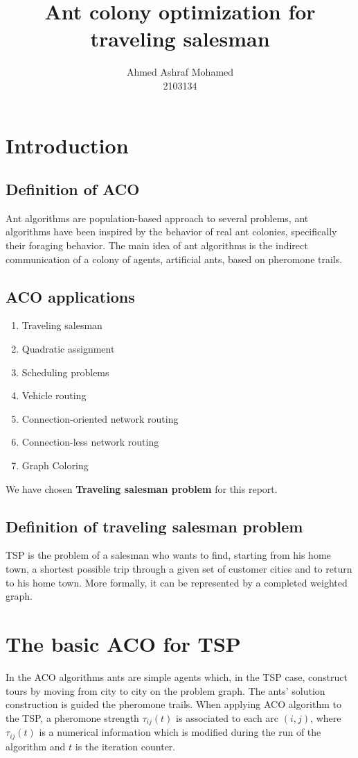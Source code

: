 \documentclass[12pt]{article}
\title{Ant colony optimization for traveling salesman}
\author{Ahmed Ashraf Mohamed \\ 2103134}
\date{}
\begin{document}
\maketitle
\section{Introduction}
\subsection{Definition of ACO}
Ant algorithms are population-based approach to several problems, ant algorithms have been inspired by the behavior of real ant colonies, specifically their foraging behavior. The main idea of ant algorithms is the indirect communication of a colony of agents, artificial ants, based on pheromone trails.
\subsection{ACO applications}
\begin{enumerate}
    \item Traveling salesman
    \item Quadratic assignment
    \item Scheduling problems
    \item Vehicle routing
    \item Connection-oriented network routing
    \item Connection-less network routing
    \item Graph Coloring
\end{enumerate}
We have chosen \textbf{Traveling salesman problem} for this report.
\subsection{Definition of traveling salesman problem}
TSP is the problem of a salesman who wants to find, starting from his home town, a shortest possible trip through a given set of customer cities and to return to his home town. More formally, it can be represented by a completed weighted graph.
\section{The basic ACO for TSP}
In the ACO algorithms ants are simple agents which, in the TSP case, construct tours by moving from city to city on the problem graph. The ants' solution construction is guided the pheromone trails. When applying ACO algorithm to the TSP, a pheromone strength \(\tau_{ij} (t)\) is associated to each arc  \(\left(i,j\right)\), where \(\tau_{ij}(t)\) is a numerical information which is modified during the run of the algorithm and \(t\) is the iteration counter.
\end{document}
